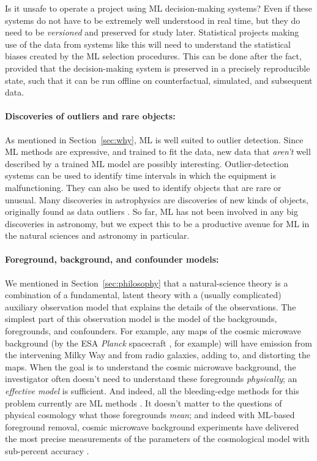 \documentclass[10pt]{article}
\newcommand{\sectionname}{Section}
\begin{document}
Is it unsafe to operate a project using ML decision-making systems?
Even if these systems do not have to be extremely well understood in real time, but they do need to be \emph{versioned} and preserved for study later.
Statistical projects making use of the data from systems like this will need to understand the statistical biases created by the ML selection procedures.
This can be done after the fact, provided that the decision-making system is preserved in a precisely reproducible state, such that it can be run offline on counterfactual, simulated, and subsequent data.

\paragraph{Discoveries of outliers and rare objects:}
As mentioned in \sectionname~\ref{sec:why}, ML is well suited to outlier detection.
Since ML methods are expressive, and trained to fit the data, new data that \emph{aren't} well described by a trained ML model are possibly interesting.
Outlier-detection systems can be used to identify time intervals in which the equipment is malfunctioning.
They can also be used to identify objects that are rare or unusual.
Many discoveries in astrophysics are discoveries of new kinds of objects, originally found as data outliers \cite{quasars, voorwerp}.
So far, ML has not been involved in any big discoveries in astronomy, but we expect this to be a productive avenue for ML in the natural sciences and astronomy in particular.

\paragraph{Foreground, background, and confounder models:}
We mentioned in \sectionname~\ref{sec:philosophy} that a natural-science theory is a combination of a fundamental, latent theory with a (usually complicated) auxiliary observation model that explains the details of the observations.
The simplest part of this observation model is the model of the backgrounds, foregrounds, and confounders.
For example, any maps of the cosmic microwave background (by the ESA \textsl{Planck} spacecraft \cite{planck_maps}, for example) will have emission from the intervening Milky Way and from radio galaxies, adding to, and distorting the maps.
When the goal is to understand the cosmic microwave background, the investigator often doesn't need to understand these foregrounds \emph{physically}; an \emph{effective model} is sufficient.
And indeed, all the bleeding-edge methods for this problem currently are ML methods \cite{cmb_foregrounds}.
It doesn't matter to the questions of physical cosmology what those foregrounds \emph{mean}; and indeed with ML-based foreground removal, cosmic microwave background experiments have delivered the most precise measurements of the parameters of the cosmological model with sub-percent accuracy \cite{planck_parameters}.
\end{document}
